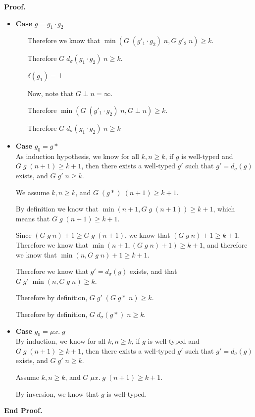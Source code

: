 \documentclass{article}
\newcommand{\fix}[2]{\mu {#1}.\;{#2}}
\newcommand{\deriv}[2]{d_{#1}({#2})}
\newcommand{\emptify}[1]{\delta({#1})}
\newenvironment{proof}{\noindent\textbf{Proof.}}
{\noindent\textbf{End Proof.}}
\newenvironment{caseblock}{\begin{itemize}}{\end{itemize}}
\newenvironment{case}[1]{\item \textbf{Case} {#1}\\}{}
\begin{document}
\begin{proof}
\begin{caseblock}
\begin{case}{$g = g_1\cdot g_2$}
\begin{itemize}
          Therefore we know that $\min(G\;(g'_1\cdot g_2)\;n, G\;g'_2\;n) \geq k$. 
      
          Therefore $G\;\deriv{\sigma}{g_1\cdot g_2}\;n \geq k$. 

        \item[$\emptify{g_1} = \bot$]

          Now, note that $G\;\bot\;n = \infty$. 

          Therefore $\min(G\;(g'_1\cdot g_2)\;n, G\;\bot\;n) \geq k$. 

          Therefore $G\;\deriv{\sigma}{g_1\cdot g_2}\;n \geq k$
      \end{itemize}
    \end{case}
      
    \begin{case}{$g_0 = g*$}
      As induction hypothesis, we know for all $k, n \geq k$, if $g$
      is well-typed and $G\;g\;(n+1) \geq k+1$, then there exists a
      well-typed $g'$ such that $g' = \deriv{\sigma}{g}$ exists, and
      $G\;g'\;n \geq k$.

      We assume $k, n \geq k$, and $G\;(g*)\;(n+1) \geq k+1$. 

      By definition we know that $\min(n+1, G\;g\;(n+1)) \geq k+1$, 
      which means that $G\;g\;(n+1) \geq k+1$. 

      Since $(G\;g\;n)+1 \geq G\;g\;(n+1)$, we know that 
      $(G\;g\;n)+1 \geq k+1$. Therefore we know that 
      $\min(n+1, (G\;g\;n)+1) \geq k+1$, and therefore we
      know that $\min(n, G\;g\;n)+1 \geq k+1$. 

      Therefore we know that $g' = \deriv{\sigma}{g}$ exists, 
      and that $G\;g'\;\min(n, G\;g\;n) \geq k$. 

      Therefore by definition, $G\;g'\;(G\;g*\;n) \geq k$.

      Therefore by definition, $G\;\deriv{\sigma}{g*}\;n \geq k$. 
    \end{case}

    \begin{case}{$g_0 = \fix{x}{g}$}
      By induction, we know for all $k, n \geq k$, if $g$
      is well-typed and $G\;g\;(n+1) \geq k+1$, then there exists a
      well-typed $g'$ such that $g' = \deriv{\sigma}{g}$ exists, and
      $G\;g'\;n \geq k$.

      Assume $k, n \geq k$, and $G\;\fix{x}{g}\;(n+1) \geq k+1$. 

      By inversion, we know that $g$ is well-typed.


\end{case}
\end{caseblock}
\end{proof}
\end{document}

